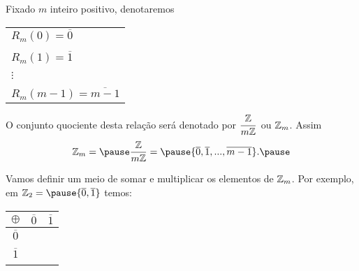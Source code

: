 \documentclass{beamer}
\begin{document}
    \begin{frame}
        \begin{observacao}
        Fixado $m$ inteiro positivo, \pause denotaremos\pause
        \begin{center}
            \begin{tabular}{l}
                $R_{m}(0) = \overline{0}$\pause \\
                \\
                $R_{m}(1) = \overline{1}$\pause \\
                \\
                $\vdots$\\
                \\
                $R_{m}(m-1) = \overline{m-1}$\pause
            \end{tabular}
        \end{center}

        O conjunto quociente \pause desta rela{\c c}{\~a}o ser{\'a} denotado por $\displaystyle\frac{\mathbb{Z}}{m\mathbb{Z}}$ \pause ou $\mathbb{Z}_m$. \pause Assim\pause
        \[
            \z_m = \pause \displaystyle\frac{\z}{m\z} = \pause \{\overline{0},\overline{1},...,\overline{m-1}\}.\pause
        \]
        \end{observacao}
    \end{frame}

    \begin{frame}
        Vamos definir um meio de somar \pause e multiplicar os elementos de $\mathbb{Z}_m$. \pause Por exemplo, em $\z_2 = \pause \{\overline{0},\overline{1}\}$ \pause temos:
        \begin{table}[h]
           \setlength{\arrayrulewidth}{0,5\arrayrulewidth}
           \hskip-8.0cm
           \begin{tabular}{|c|c|c|} 
              \hline
              $\oplus$ & $\overline{0}$ & $\overline{1}$ \T\\
              \hline
              $\overline{0}$ & \phantom{abc} & \phantom{abc}\T\\
              & & \\
              \hline
              $\overline{1}$ & \phantom{abc} & \phantom{abc}\T\\
              & & \\
              \hline
           \end{tabular}
        \end{table}
    \end{frame}
\end{document}
